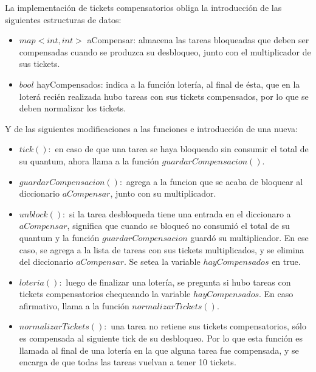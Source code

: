 \vspace{2mm}

La implementaci\'on  de tickets compensatorios obliga la introducci\'on de las siguientes estructuras de datos:

\begin{itemize}

\item $map<int,int>$ aCompensar: almacena las tareas bloqueadas que deben ser compensadas cuando se produzca su desbloqueo, junto con el multiplicador de sus tickets.

\item $bool$ hayCompensados: indica a la funci\'on loter\'ia, al final de \'esta, que en la loter\'a reci\'en realizada hubo tareas con sus tickets compensados, por lo que se deben normalizar los tickets.

\end{itemize}

Y de las siguientes modificaciones a las funciones e introducci\'on de una nueva:

\begin{itemize}

\item $tick(): $ en caso de que una tarea se haya bloqueado sin consumir el total de su quantum, ahora llama a la funci\'on $guardarCompensacion()$.

\item $guardarCompensacion():$ agrega a la funcion que se acaba de bloquear al diccionario $aCompensar$, junto con su multiplicador.

\item $unblock(): $ si la tarea desbloqueda tiene una entrada en el diccionaro a $aCompensar$, significa que cuando se bloque\'o no consumi\'o el total de su quantum y la funci\'on $guardarCompensacion$ guard\'o su multiplicador. En ese caso, se agrega a la lista de tareas con sus tickets multiplicados, y se elimina del diccionario $aCompensar$. Se setea la variable $hayCompensados$ en true.

\item $loteria():$ luego de finalizar una loter\'ia, se pregunta si hubo tareas con tickets compensatorios chequeando la variable $hayCompensados$. En caso afirmativo, llama a la funci\'on $normalizarTickets()$.


\item $normalizarTickets():$ una tarea no retiene sus tickets compensatorios, s\'olo es compensada al siguiente tick de su desbloqueo. Por lo que esta funci\'on es llamada al final de una loter\'ia en la que alguna tarea fue compensada, y se encarga de que todas las tareas vuelvan a tener 10 tickets. 

\end{itemize}

